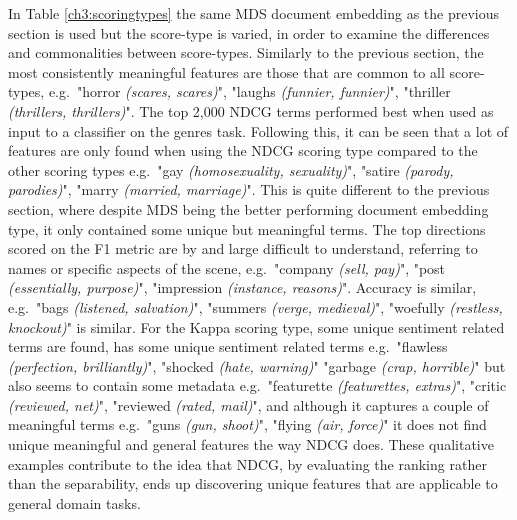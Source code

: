 In Table \ref{ch3:scoringtypes} the same MDS document embedding as the previous section is used but the score-type is varied, in order to examine the differences and commonalities between score-types.  Similarly to the previous section,   the most consistently meaningful features are those that are common to all score-types, e.g.\ "horror \textit{(scares, scares)}", "laughs \textit{(funnier, funnier)}", "thriller \textit{(thrillers, thrillers)}". The top 2,000 NDCG terms performed best when used as input to a classifier on the genres task. Following this, it can be seen that a lot of features are only found when using the NDCG scoring type compared to the other scoring types e.g.\ "gay \textit{(homosexuality, sexuality)}", "satire \textit{(parody, parodies)}",  "marry \textit{(married, marriage)}". This is quite different to the previous section, where despite MDS being the better performing document embedding type, it only contained some unique but meaningful terms. The top directions scored on  the F1 metric  are by and large  difficult to understand, referring to names or specific aspects of the scene, e.g.\ "company \textit{(sell, pay)}", "post \textit{(essentially, purpose)}", "impression \textit{(instance, reasons)}". Accuracy is similar, e.g.\ "bags \textit{(listened, salvation)}",  "summers \textit{(verge, medieval)}", "woefully \textit{(restless, knockout)}" is similar. For the Kappa scoring type, some unique  sentiment  related terms are found, has some unique sentiment related terms e.g.\ "flawless \textit{(perfection, brilliantly)}", "shocked \textit{(hate, warning)}" "garbage \textit{(crap, horrible)}" but also seems to contain some metadata e.g.\ "featurette \textit{(featurettes, extras)}", "critic \textit{(reviewed, net)}", "reviewed \textit{(rated, mail)}", and although it captures  a couple of meaningful terms e.g.\ "guns \textit{(gun, shoot)}", "flying \textit{(air, force)}" it does not find unique meaningful and general features the way NDCG does. These qualitative examples contribute to the idea that NDCG, by evaluating the ranking rather than the separability, ends up discovering unique features that are applicable to general domain tasks.
